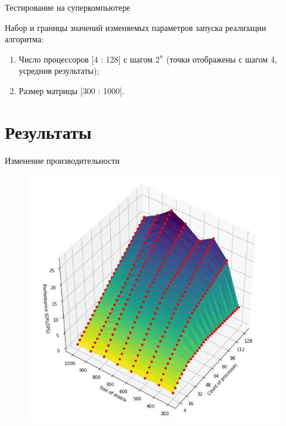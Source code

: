 \documentclass{beamer}
\begin{document}
\begin{frame}{Тестирование на суперкомпьютере}

Набор и границы значений изменяемых параметров запуска реализации алгоритма: 

\begin{enumerate}
\item Число процессоров [4 : 128] с шагом $ 2^n$ (точки отображены с шагом 4, усреднив результаты);
\item Размер матрицы [300 : 1000].
\end{enumerate}

\end{frame}




\section{Результаты} 

\begin{frame}{Изменение производительности}

\begin{figure}[ht]
\centering 
    \includegraphics[scale=0.4]{../image/p.jpg}
\end{figure}

\end{frame}
\end{document}
